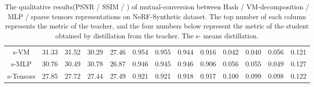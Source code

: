 \documentclass[letterpaper]{article} \usepackage{aaai23}  \usepackage{times}  \usepackage{helvet}  \usepackage{courier}  \usepackage[hyphens]{url}  \usepackage{graphicx} \urlstyle{rm} \def\UrlFont{\rm}  \usepackage{natbib}  \usepackage{caption} \frenchspacing  \setlength{\pdfpagewidth}{8.5in}  \setlength{\pdfpageheight}{11in}  \usepackage{multirow}
\begin{document}
\begin{table*}[t]
\begin{tabular}{c|cccccccccccc}
s-VM                       & 31.33                                                & 31.52                                              & 30.29                                               & \multicolumn{1}{c|}{27.46}                                                  & 0.954                                                & 0.955                                              & 0.944                                               & \multicolumn{1}{c|}{0.916}                                                  & 0.042                                                & 0.040                                              & 0.056                                               & 0.121                                                  \\
s-MLP                      & 30.76                                                & 30.49                                              & 30.78                                               & \multicolumn{1}{c|}{26.87}                                                  & 0.946                                                & 0.945                                              & 0.946                                               & \multicolumn{1}{c|}{0.906}                                                  & 0.056                                                & 0.055                                              & 0.049                                               & 0.127                                                  \\
s-Tensors                   & 27.85                                                & 27.72                                              & 27.44                                               & \multicolumn{1}{c|}{27.49}                                                  & 0.921                                                & 0.921                                              & 0.918                                               & \multicolumn{1}{c|}{0.917}                                                  & 0.100                                                & 0.099                                              & 0.098                                               & 0.122                                                  \\ \hline
\end{tabular}
\caption{The qualitative results(PSNR / SSIM / ) of mutual-conversion between Hash / VM-decomposition / MLP / sparse tensors representations on NeRF-Synthetic dataset. The top number of each column represents the metric of the teacher, and the four numbers below represent the metric of the student obtained by distillation from the teacher. The s- means distillation.}
\label{table-mutual}
\end{table*}
\end{document}
